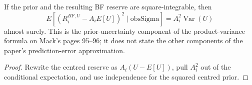 \begin{theorem}\label{thm:bfPriorVar}\leanok
{}
If the prior and the resulting BF reserve are square-integrable, then
\[
  E\left[(R^{BF,U}_i - A_iE[U])^2 \mid \mathrm{obsSigma}\right]
    = A_i^2\operatorname{Var}(U)
\]
almost surely. This is the prior-uncertainty component of the product-variance formula on
Mack's pages 95--96; it does not state the other components of the paper's prediction-error
approximation.
\end{theorem}
\begin{proof}\leanok Rewrite the centred reserve as $A_i(U-E[U])$, pull $A_i^2$ out of the
conditional expectation, and use independence for the squared centred prior. \end{proof}
